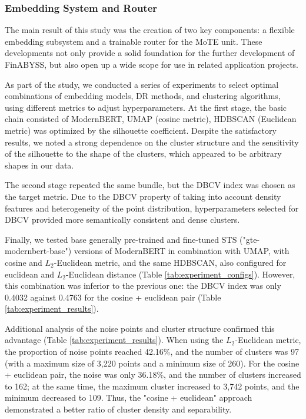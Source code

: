 \subsubsection{Embedding System and Router}
\label{sec:emb_sys_and_router}
The main result of this study was the creation of two key components: a flexible embedding
subsystem and a trainable router for the MoTE unit. These developments not only provide
a solid foundation for the further development of FinABYSS, but also open up a wide scope
for use in related application projects.

As part of the study, we conducted a series of experiments to select optimal combinations
of embedding models, DR methods, and clustering algorithms, using different
metrics to adjust hyperparameters. At the first stage, the basic chain consisted of ModernBERT,
UMAP (cosine metric), HDBSCAN (Euclidean metric) was optimized by the silhouette coefficient.
Despite the satisfactory results, we noted a strong dependence on the cluster structure and
the sensitivity of the silhouette to the shape of the clusters, which appeared to be arbitrary
shapes in our data.

The second stage repeated the same bundle, but the DBCV index was chosen as the target metric. Due
to the DBCV property of taking into account density features and heterogeneity of the point
distribution, hyperparameters selected for DBCV provided more semantically consistent and dense
clusters.

Finally, we tested base generally pre-trained and fine-tuned STS ("gte-modernbert-base")
versions of ModernBERT \parencite{Warner2024ModernBERT, MGTE2024}
in combination with UMAP, with cosine and $L_2$-Euclidean metric, and the same HDBSCAN,
also configured for euclidean and $L_2$-Euclidean distance (Table \ref{tab:experiment_configs}).
However, this combination was inferior to the previous one: the DBCV index was only 0.4032
against 0.4763 for the cosine + euclidean pair (Table \ref{tab:experiment_results}).



Additional analysis of the noise points and cluster structure confirmed this advantage
(Table \ref{tab:experiment_results}). When using the $L_2$-Euclidean metric, the proportion
of noise points reached 42.16\%, and the number of clusters was 97 (with a maximum size
of 3,220 points and a minimum size of 260). For the cosine + euclidean pair, the noise was
only 36.18\%, and the number of clusters increased to 162; at the same time, the maximum
cluster increased to 3,742 points, and the minimum decreased to 109. Thus, the "cosine +
euclidean" approach demonstrated a better ratio of cluster density and separability.

